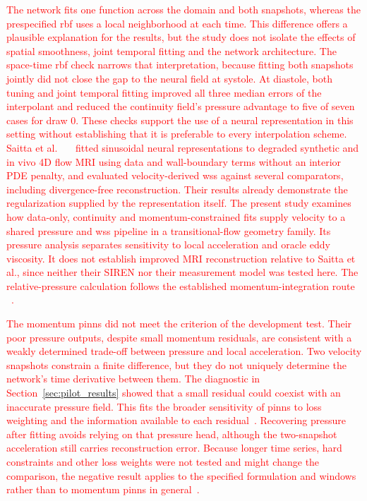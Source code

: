 \documentclass[12pt,a4paper]{article}
\newcommand{\PINNs}{\acp{pinn}\xspace}
\newcommand{\WSS}{\ac{wss}\xspace}
\newcommand{\RBF}{\ac{rbf}\xspace}
\theoremstyle{definition}
\numberwithin{equation}{section}
\newcommand{\revision}[1]{\textcolor{red}{#1}}
\begin{document}
\revision{The network fits one function across the domain and both snapshots, whereas the prespecified \RBF uses a local neighborhood at each time. This difference offers a plausible explanation for the results, but the study does not isolate the effects of spatial smoothness, joint temporal fitting and the network architecture. The space-time \RBF check narrows that interpretation, because fitting both snapshots jointly did not close the gap to the neural field at systole. At diastole, both tuning and joint temporal fitting improved all three median errors of the interpolant and reduced the continuity field's pressure advantage to five of seven cases for draw 0. These checks support the use of a neural representation in this setting without establishing that it is preferable to every interpolation scheme. Saitta et al.~\mbox{ \cite{saitta2024implicit} } fitted sinusoidal neural representations to degraded synthetic and in vivo 4D flow MRI using data and wall-boundary terms without an interior PDE penalty, and evaluated velocity-derived \WSS against several comparators, including divergence-free reconstruction. Their results already demonstrate the regularization supplied by the representation itself. The present study examines how data-only, continuity and momentum-constrained fits supply velocity to a shared pressure and \WSS pipeline in a transitional-flow geometry family. Its pressure analysis separates sensitivity to local acceleration and oracle eddy viscosity. It does not establish improved MRI reconstruction relative to Saitta et al., since neither their SIREN nor their measurement model was tested here. The relative-pressure calculation follows the established momentum-integration route ~\cite{krittian2012finite,bertoglio2018relative}.}

\revision{The momentum \PINNs did not meet the criterion of the development test. Their poor pressure outputs, despite small momentum residuals, are consistent with a weakly determined trade-off between pressure and local acceleration. Two velocity snapshots constrain a finite difference, but they do not uniquely determine the network's time derivative between them. The diagnostic in Section~\ref{sec:pilot_results} showed that a small residual could coexist with an inaccurate pressure field. This fits the broader sensitivity of \PINNs to loss weighting and the information available to each residual~\cite{krishnapriyan2021failure,wang2021gradient}. Recovering pressure after fitting avoids relying on that pressure head, although the two-snapshot acceleration still carries reconstruction error. Because longer time series, hard constraints and other loss weights were not tested and might change the comparison, the negative result applies to the specified formulation and windows rather than to momentum \PINNs in general~\cite{mcgreivy2024weak}.}
\end{document}
